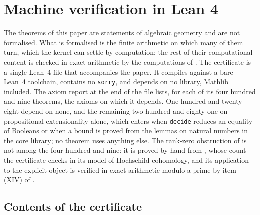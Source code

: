 \section{Machine verification in Lean 4}\label{sec:lean}

The theorems of this paper are statements of algebraic geometry and are not
formalised. What is formalised is the finite arithmetic on which many of them
turn, which the kernel can settle by computation; the rest of their
computational content is checked in exact arithmetic by the computations of
. The certificate is a single Lean~4 file that
accompanies the paper. It compiles against a bare Lean~4 toolchain, contains
no \texttt{sorry}, and depends on no library, Mathlib included. The axiom
report at the end of the file lists, for each of its four hundred and nine theorems,
the axioms on which it depends. One hundred and twenty-eight depend on none, and the
remaining two hundred and eighty-one on propositional extensionality alone, which enters when
\texttt{decide} reduces an equality of Booleans or when a bound is proved from
the lemmas on natural numbers in the core library; no theorem uses anything
else. The rank-zero obstruction of  is not among the
four hundred and nine: it is proved by hand from , whose count
the certificate checks in its model of Hochschild cohomology, and its
application to the explicit object is verified in exact arithmetic modulo a
prime by item (XIV) of .

\subsection{Contents of the certificate}

